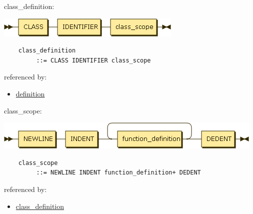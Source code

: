 \begin{minipage}{\textwidth}
    \protect\hypertarget{class_definition}{}{class\_definition:}

    \includegraphics[width=3.47917in,height=0.37500in]{diagram/class_definition.png}

    \begin{verbatim}
    class_definition
         ::= CLASS IDENTIFIER class_scope
    \end{verbatim}

    referenced by:

    \begin{itemize}
            \tightlist
        \item
            \protect\hyperlink{definition}{definition}
    \end{itemize}

\end{minipage}

\begin{minipage}{\textwidth}
    \protect\hypertarget{class_scope}{}{class\_scope:}

    \includegraphics[width=5.10417in,height=0.54167in]{diagram/class_scope.png}

    \begin{verbatim}
    class_scope
         ::= NEWLINE INDENT function_definition+ DEDENT
    \end{verbatim}

    referenced by:

    \begin{itemize}
            \tightlist
        \item
            \protect\hyperlink{class_definition}{class\_definition}
    \end{itemize}

\end{minipage}

